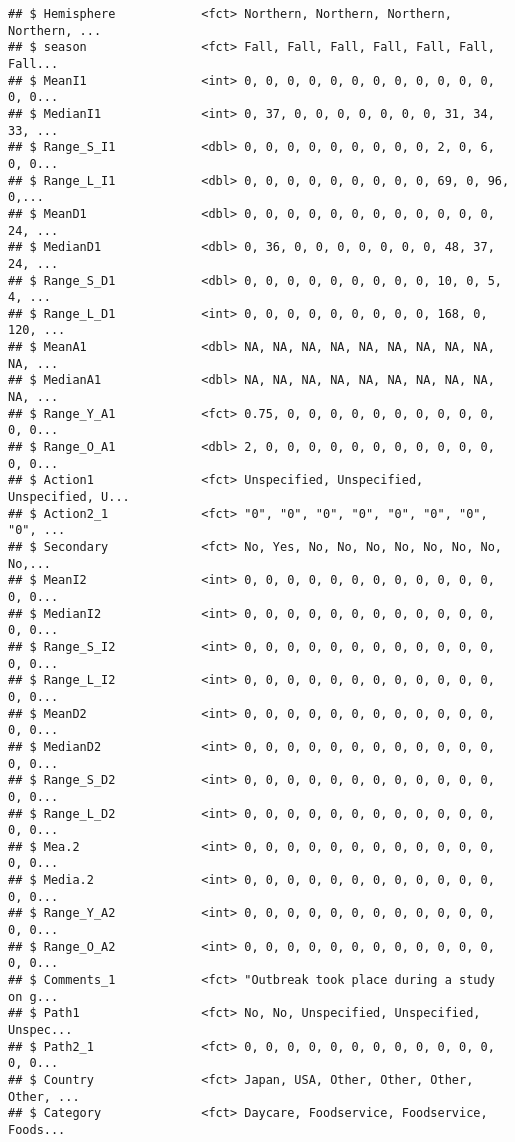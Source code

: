 \documentclass[]{article}
\begin{document}
\begin{verbatim}
## $ Hemisphere            <fct> Northern, Northern, Northern, Northern, ...
## $ season                <fct> Fall, Fall, Fall, Fall, Fall, Fall, Fall...
## $ MeanI1                <int> 0, 0, 0, 0, 0, 0, 0, 0, 0, 0, 0, 0, 0, 0...
## $ MedianI1              <int> 0, 37, 0, 0, 0, 0, 0, 0, 0, 31, 34, 33, ...
## $ Range_S_I1            <dbl> 0, 0, 0, 0, 0, 0, 0, 0, 0, 2, 0, 6, 0, 0...
## $ Range_L_I1            <dbl> 0, 0, 0, 0, 0, 0, 0, 0, 0, 69, 0, 96, 0,...
## $ MeanD1                <dbl> 0, 0, 0, 0, 0, 0, 0, 0, 0, 0, 0, 0, 24, ...
## $ MedianD1              <dbl> 0, 36, 0, 0, 0, 0, 0, 0, 0, 48, 37, 24, ...
## $ Range_S_D1            <dbl> 0, 0, 0, 0, 0, 0, 0, 0, 0, 10, 0, 5, 4, ...
## $ Range_L_D1            <int> 0, 0, 0, 0, 0, 0, 0, 0, 0, 168, 0, 120, ...
## $ MeanA1                <dbl> NA, NA, NA, NA, NA, NA, NA, NA, NA, NA, ...
## $ MedianA1              <dbl> NA, NA, NA, NA, NA, NA, NA, NA, NA, NA, ...
## $ Range_Y_A1            <fct> 0.75, 0, 0, 0, 0, 0, 0, 0, 0, 0, 0, 0, 0...
## $ Range_O_A1            <dbl> 2, 0, 0, 0, 0, 0, 0, 0, 0, 0, 0, 0, 0, 0...
## $ Action1               <fct> Unspecified, Unspecified, Unspecified, U...
## $ Action2_1             <fct> "0", "0", "0", "0", "0", "0", "0", "0", ...
## $ Secondary             <fct> No, Yes, No, No, No, No, No, No, No, No,...
## $ MeanI2                <int> 0, 0, 0, 0, 0, 0, 0, 0, 0, 0, 0, 0, 0, 0...
## $ MedianI2              <int> 0, 0, 0, 0, 0, 0, 0, 0, 0, 0, 0, 0, 0, 0...
## $ Range_S_I2            <int> 0, 0, 0, 0, 0, 0, 0, 0, 0, 0, 0, 0, 0, 0...
## $ Range_L_I2            <int> 0, 0, 0, 0, 0, 0, 0, 0, 0, 0, 0, 0, 0, 0...
## $ MeanD2                <int> 0, 0, 0, 0, 0, 0, 0, 0, 0, 0, 0, 0, 0, 0...
## $ MedianD2              <int> 0, 0, 0, 0, 0, 0, 0, 0, 0, 0, 0, 0, 0, 0...
## $ Range_S_D2            <int> 0, 0, 0, 0, 0, 0, 0, 0, 0, 0, 0, 0, 0, 0...
## $ Range_L_D2            <int> 0, 0, 0, 0, 0, 0, 0, 0, 0, 0, 0, 0, 0, 0...
## $ Mea.2                 <int> 0, 0, 0, 0, 0, 0, 0, 0, 0, 0, 0, 0, 0, 0...
## $ Media.2               <int> 0, 0, 0, 0, 0, 0, 0, 0, 0, 0, 0, 0, 0, 0...
## $ Range_Y_A2            <int> 0, 0, 0, 0, 0, 0, 0, 0, 0, 0, 0, 0, 0, 0...
## $ Range_O_A2            <int> 0, 0, 0, 0, 0, 0, 0, 0, 0, 0, 0, 0, 0, 0...
## $ Comments_1            <fct> "Outbreak took place during a study on g...
## $ Path1                 <fct> No, No, Unspecified, Unspecified, Unspec...
## $ Path2_1               <fct> 0, 0, 0, 0, 0, 0, 0, 0, 0, 0, 0, 0, 0, 0...
## $ Country               <fct> Japan, USA, Other, Other, Other, Other, ...
## $ Category              <fct> Daycare, Foodservice, Foodservice, Foods...

\end{verbatim}
\end{document}

